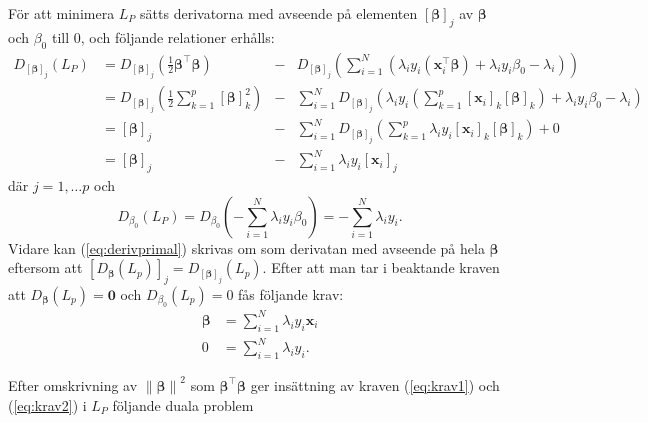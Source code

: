 \documentclass[a4paper, 12pt]{report}
\theoremstyle{definition}
\theoremstyle{remark}
\newcommand{\bfbeta}{{\boldsymbol{\beta}}}
\begin{document}
För att minimera $L_P$ sätts derivatorna med avseende på elementen $\left[\bfbeta\right]_j$ av $\bfbeta$ och $\beta_0$ till 0, och följande relationer erhålls:
\begin{equation}\label{eq:derivprimal}
\begin{aligned}
	D_{ \left[\bfbeta\right]_j } (L_P) &= D_{ \left[\bfbeta\right]_j } \left( \frac{1}{2} \bfbeta^\intercal \bfbeta \right) &- &D_{ \left[\bfbeta\right]_j } \left( \sum_{i=1}^{N} \left( \lambda_i y_i \left( \mathbf{x}_i^\intercal\bfbeta \right) + \lambda_i y_i \beta_0 - \lambda_i \right)\right)\\
	&= D_{ \left[\bfbeta\right]_j } \left( \frac{1}{2} \sum_{k=1}^{p} \left[\bfbeta\right]_k^2 \right) &- &\sum_{i=1}^{N} D_{ \left[\bfbeta\right]_j } \left(  \lambda_i y_i \left(\sum_{k=1}^{p}\left[\mathbf{x}_i\right]_k\left[\bfbeta\right]_k \right) + \lambda_i y_i \beta_0-\lambda_i \right)\\
	&= [\bfbeta]_j &- &\sum_{i=1}^{N} D_{ \left[\bfbeta\right]_j } \left( \sum_{k=1}^{p} \lambda_i y_i \left[\mathbf{x}_i\right]_k\left[\bfbeta\right]_k \right) + 0\\
	&= [\bfbeta]_j &- &\sum_{i=1}^{N}\lambda_i y_i \left[ \mathbf{x}_i \right]_j
\end{aligned}
\end{equation}
där $j=1,\dots p$ och
\begin{equation*}
	D_{\beta_0}(L_P) = D_{\beta_0}\left( -\sum_{i=1}^{N} \lambda_i y_i \beta_0 \right) = -\sum_{i=1}^{N} \lambda_i y_i.
\end{equation*}
Vidare kan (\ref{eq:derivprimal}) skrivas om som derivatan med avseende på hela $\bfbeta$ eftersom att $ \left[ D_{ \bfbeta }(L_p) \right]_j = D_{\left[ \bfbeta \right]_j}(L_p) $. Efter att man tar i beaktande kraven att $ D_{ \bfbeta }(L_p) = \mathbf{0} $ och $ D_{\beta_0}(L_p)=0 $ fås följande krav:
\begin{align}\label{eq:krav1}
	\bfbeta &= \sum_{i=1}^{N} \lambda_i y_i \mathbf{x}_i\\
	0 &= \sum_{i=1}^{N} \lambda_i y_i.\label{eq:krav2}
\end{align}

Efter omskrivning av $\left\| \bfbeta \right\|^2$ som $\bfbeta^\intercal\bfbeta$ ger insättning av kraven (\ref{eq:krav1}) och (\ref{eq:krav2}) i $L_P$ följande duala problem
\end{document}
